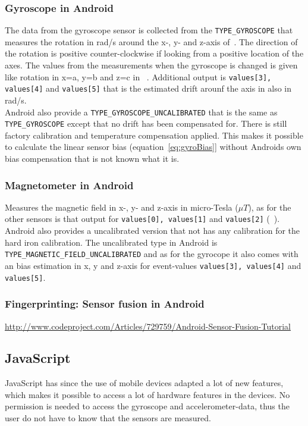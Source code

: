 \subsubsection{Gyroscope in Android}\label{subsec:gyroAndroid}
The data from the gyroscope sensor is collected from the \texttt{TYPE\_GYROSCOPE} that measures the rotation in rad/s around the x-, y- and z-axis of~. The direction of the rotation is positive counter-clockwise if looking from a positive location of the axes. The values from the measurements when the gyroscope is changed is given like rotation in x=a, y=b and z=c in ~. Additional output is \texttt{values[3], values[4]} and \texttt{values[5]} that is the estimated drift arounf the axis in also in rad/s.\\
Android also provide a \texttt{TYPE\_GYROSCOPE\_UNCALIBRATED} that is the same as \texttt{TYPE\_GYROSCOPE} except that no drift has been compensated for. There is still factory calibration and temperature compensation applied. \cite[]{android:sensorEvent} This makes it possible to calculate the linear sensor bias (equation~\ref{eq:gyroBias}] without Androids own bias compensation that is not known what it is.



\subsubsection{Magnetometer in Android}\label{subsec:magnAndroid}
Measures the magnetic field in x-, y- and z-axis in micro-Tesla ($\mu T$), as for the other sensors is that output for \texttt{values[0], values[1]} and \texttt{values[2]} (~). Android also provides a uncalibrated version that not has any calibration for the hard iron calibration. The uncalibrated type in Android is \texttt{TYPE\_MAGNETIC\_FIELD\_UNCALIBRATED} and as for the gyrocope it also comes with an bias estimation in x, y and z-axis for event-values \texttt{values[3], values[4]} and \texttt{values[5]}. 

\subsubsection{Fingerprinting: Sensor fusion in Android}
\url{http://www.codeproject.com/Articles/729759/Android-Sensor-Fusion-Tutorial}

\subsection{JavaScript}\label{subsec:js}
JavaScript has since the use of mobile devices adapted a lot of new features, which makes it possible to access a lot of hardware features in the devices. No permission is needed to access the gyroscope and accelerometer-data, thus the user do not have to know that the sensors are measured.


